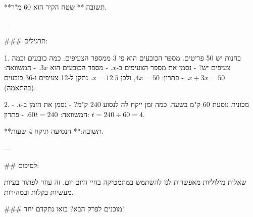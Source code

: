**תשובה:** שטח הקיר הוא 60 מ"ר.

---

### תרגילים:

1. בחנות יש 50 פריטים. מספר הכובעים הוא פי 3 ממספר הצעיפים. כמה כובעים וכמה צעיפים יש?
   - נסמן את מספר הצעיפים ב-$x$.
   - מספר הכובעים הוא $3x$.
   - המשוואה: $x + 3x = 50$.
   - פתרון: $4x = 50$, ולכן $x = 12.5$. נתקן ל-12 צעיפים ו-36 כובעים (בהתאמה).

2. מכונית נוסעת 60 ק"מ בשעה. כמה זמן ייקח לה לנסוע 240 ק"מ?
   - נסמן את הזמן ב-$t$.
   - המשוואה: $60t = 240$.
   - פתרון: $t = 240 \div 60 = 4$.

**תשובה:** הנסיעה תיקח 4 שעות.

---

## לסיכום:

שאלות מילוליות מאפשרות לנו להשתמש במתמטיקה בחיי היום-יום. זה עוזר לפתור בעיות מעשיות בקלות ובמהירות. 

### מוכנים לפרק הבא? בואו נתקדם יחד!

